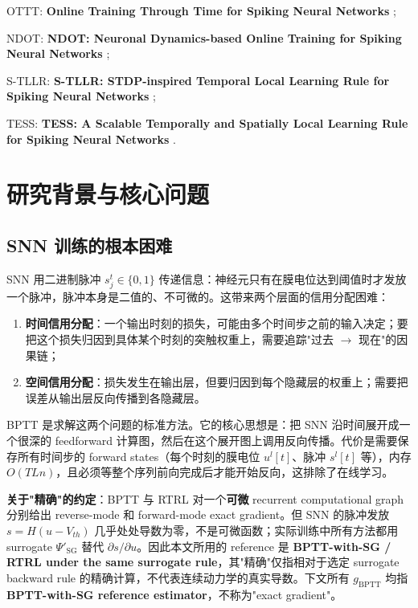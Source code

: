 \documentclass[journal,12pt,onecolumn]{IEEEtran}
\begin{document}
OTTT: \textbf{Online Training Through Time for Spiking Neural Networks} \cite{xiao_online_2022};

NDOT: \textbf{NDOT: Neuronal Dynamics-based Online Training for Spiking Neural Networks} \cite{jiang_ndot_nodate};

S-TLLR: \textbf{S-TLLR: STDP-inspired Temporal Local Learning Rule for Spiking Neural Networks} \cite{apolinario_s-tllr_2024};

TESS: \textbf{TESS: A Scalable Temporally and Spatially Local Learning Rule for Spiking Neural Networks} \cite{apolinario_tess_2025}.

\section{研究背景与核心问题}

\subsection{SNN 训练的根本困难}

SNN 用二进制脉冲 $s_j^t\in\{0,1\}$ 传递信息：神经元只有在膜电位达到阈值时才发放一个脉冲，脉冲本身是二值的、不可微的。这带来两个层面的信用分配困难：

\begin{enumerate}[leftmargin=1.5em,itemsep=0pt]
\item \textbf{时间信用分配}：一个输出时刻的损失，可能由多个时间步之前的输入决定；要把这个损失归因到具体某个时刻的突触权重上，需要追踪"过去 $\to$ 现在"的因果链；
\item \textbf{空间信用分配}：损失发生在输出层，但要归因到每个隐藏层的权重上；需要把误差从输出层反向传播到各隐藏层。
\end{enumerate}

BPTT 是求解这两个问题的标准方法。它的核心思想是：把 SNN 沿时间展开成一个很深的 feedforward 计算图，然后在这个展开图上调用反向传播。代价是需要保存所有时间步的 forward states（每个时刻的膜电位 $u^l[t]$、脉冲 $s^l[t]$ 等），内存 $O(TLn)$，且必须等整个序列前向完成后才能开始反向，这排除了在线学习。

\textbf{关于"精确"的约定}：BPTT 与 RTRL 对一个\textbf{可微} recurrent computational graph 分别给出 reverse-mode 和 forward-mode exact gradient。但 SNN 的脉冲发放 $s=H(u-V_{th})$ 几乎处处导数为零，不是可微函数；实际训练中所有方法都用 surrogate $\Psi'_{\mathrm{SG}}$ 替代 $\partial s/\partial u$。因此本文所用的 reference 是 \textbf{BPTT-with-SG / RTRL under the same surrogate rule}，其"精确"仅指相对于选定 surrogate backward rule 的精确计算，不代表连续动力学的真实导数。下文所有 $g_{\mathrm{BPTT}}$ 均指 \textbf{BPTT-with-SG reference estimator}，不称为"exact gradient"。
\end{document}
